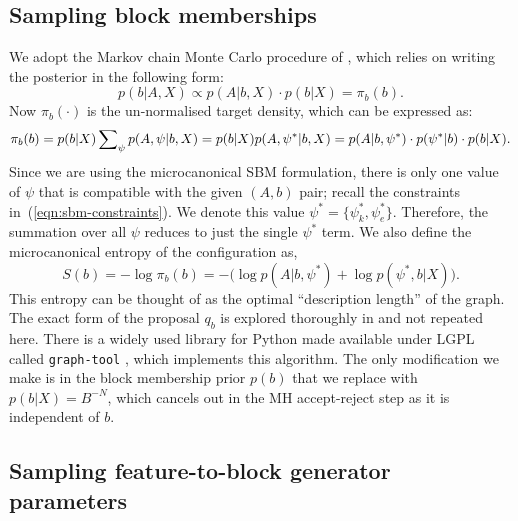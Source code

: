 \FloatBarrier
\subsection{Sampling block memberships}

We adopt the Markov chain Monte Carlo procedure of
\cite{Peixoto-MCMC},
which relies on writing the posterior in the following form:
%
\begin{equation}
	p(b | A, X) \propto p(A | b, X) \cdot p(b | X) = \pi_b(b).
\end{equation}
%
Now $\pi_b(\cdot)$ is the un-normalised target density,
which can be expressed as:
%
\begin{equation}
	\pi_b(b) = p(b|X) \sum_{\psi} \nolimits p(A , \psi | b, X) \\
	= p(b|X) p(A, \psi^* | b, X) \\
	= p(A | b, \psi^*) \cdot p(\psi^* | b) \cdot p(b | X).
\end{equation}
%
Since we are using the microcanonical SBM formulation, there is only one 
value of $\psi$ that is compatible with the given $(A, b)$ pair;
recall the constraints in~(\ref{eqn:sbm-constraints}). 
We denote this value $\psi^* = \{\psi_k^*, \psi_e^*\}$. Therefore, 
the summation over all $\psi$ reduces to just the single $\psi^*$ term.
We also define the microcanonical entropy of the configuration as,
%
\begin{equation}
	S(b) = - \log \pi_b(b) = - \Big( \log p(A | b, \psi^*) + \log p(\psi^*, b | X) \Big).
	\label{eqn:dl-form}
\end{equation}
%
This entropy can be thought of as the optimal
``description length'' of the graph. 
The exact form of the proposal $q_b$ is explored thoroughly in
\cite{Peixoto-MCMC} and not repeated here. There is a widely used 
library for Python made available under LGPL 
called \verb*|graph-tool| \cite{peixoto_graph-tool_2014}, 
which implements this algorithm. The only modification we make is in 
the block membership prior $p(b)$ that we replace with $p(b|X)=B^{-N}$, 
which cancels out in the MH accept-reject step as it is independent of $b$.

\subsection{Sampling feature-to-block generator parameters}
\label{s:sfb}

